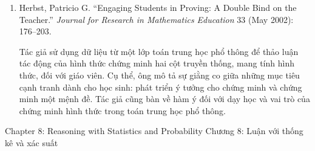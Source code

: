 {{\begin{enumerate}
        \item Herbst, Patricio G. ``Engaging Students in Proving: A Double Bind on the Teacher.'' \emph{Journal for Research in Mathematics Education} 33 (May 2002): 176--203.\vspace{.25\baselineskip}

          \par\noindent\hspace*{1em} Tác giả sử dụng dữ liệu từ một lớp toán trung học phổ thông để thảo luận tác động của hình thức chứng minh hai cột truyền thống, mang tính hình thức, đối với giáo viên. Cụ thể, ông mô tả sự giằng co giữa những mục tiêu cạnh tranh dành cho học sinh: phát triển ý tưởng cho chứng minh và chứng minh một mệnh đề. Tác giả cũng bàn về hàm ý đối với dạy học và vai trò của chứng minh hình thức trong toán trung học phổ thông.
      \end{enumerate}}
  }{\NOTE{}}

\ParallelSection
  {Chapter 8: Reasoning with Statistics and Probability}
  {Chương 8: Luận với thống kê và xác suất}
  {}

